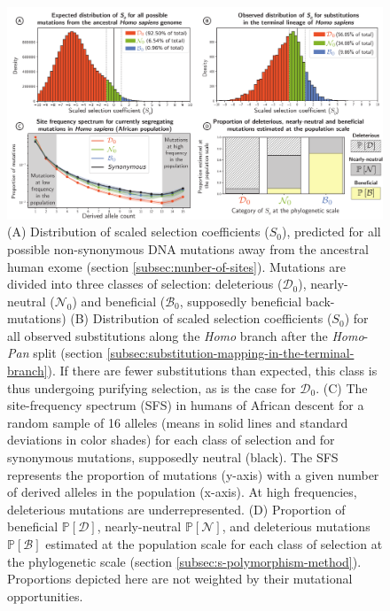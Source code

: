 \documentclass{article}
\newcommand{\proba}{\mathbb{P}}
\newcommand{\Sphy}{S_{0}}
\newcommand{\SphyDel}{\mathcal{D}_0}
\newcommand{\SphyNeu}{\mathcal{N}_0}
\newcommand{\SphyBen}{\mathcal{B}_0}
\newcommand{\SpopDel}{\mathcal{D}}
\newcommand{\SpopNeu}{\mathcal{N}}
\newcommand{\SpopBen}{\mathcal{B}}
\newcommand{\ProbaPopDel}{\proba [ \SpopDel]}
\newcommand{\ProbaPopNeu}{\proba [ \SpopNeu ]}
\newcommand{\ProbaPopBen}{\proba [ \SpopBen ]}
\begin{document}
    \begin{figure}[!h]
        \centering
        \includegraphics[width=\textwidth, page=1] {artworks/figure.homo-afr-results}
        \caption{
            (A) Distribution of scaled selection coefficients ($\Sphy$), predicted for all possible non-synonymous DNA mutations away from the ancestral human exome (section \ref{subsec:nunber-of-sites}).
            Mutations are divided into three classes of selection: deleterious ($\SphyDel$), nearly-neutral ($\SphyNeu$) and beneficial ($\SphyBen$, supposedly beneficial back-mutations)
            (B) Distribution of scaled selection coefficients ($\Sphy$) for all observed substitutions along the \textit{Homo} branch after the \textit{Homo}-\textit{Pan} split (section \ref{subsec:substitution-mapping-in-the-terminal-branch}).
            If there are fewer substitutions than expected, this class is thus undergoing purifying selection, as is the case for $\SphyDel$.
            (C) The site-frequency spectrum (SFS) in humans of African descent for a random sample of 16 alleles (means in solid lines and standard deviations in color shades) for each class of selection and for synonymous mutations, supposedly neutral (black). The SFS represents the proportion of mutations (y-axis) with a given number of derived alleles in the population (x-axis).
            At high frequencies, deleterious mutations are underrepresented.
            (D) Proportion of beneficial $\ProbaPopDel$, nearly-neutral $\ProbaPopNeu$, and deleterious mutations $\ProbaPopBen$ estimated at the population scale for each class of selection at the phylogenetic scale (section \ref{subsec:s-polymorphism-method}). Proportions depicted here are not weighted by their mutational opportunities.
        }
        \label{fig:homo-afr-results}
    \end{figure}
\end{document}
